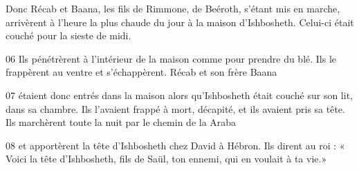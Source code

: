 Donc Récab et Baana, les fils de Rimmone, de Beéroth, s’étant mis en marche, arrivèrent à l’heure la plus chaude du jour à la maison d’Ishbosheth. Celui-ci était couché pour la sieste de midi.

06 Ils pénétrèrent à l’intérieur de la maison comme pour prendre du blé. Ils le frappèrent au ventre et s’échappèrent. Récab et son frère Baana

07 étaient donc entrés dans la maison alors qu’Ishbosheth était couché sur son lit, dans sa chambre. Ils l’avaient frappé à mort, décapité, et ils avaient pris sa tête. Ils marchèrent toute la nuit par le chemin de la Araba

08 et apportèrent la tête d’Ishbosheth chez David à Hébron. Ils dirent au roi : « Voici la tête d’Ishbosheth, fils de Saül, ton ennemi, qui en voulait à ta vie.»
